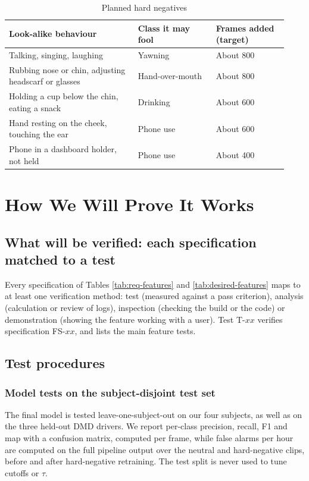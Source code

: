 \begin{table}[htbp]
\centering
\caption{Planned hard negatives}
\label{tab:ch5-04}
\footnotesize
\setlength{\tabcolsep}{3pt}
\renewcommand{\arraystretch}{1.15}
\begin{tabular}{|p{0.430\linewidth}|p{0.260\linewidth}|p{0.240\linewidth}|}
\hline
\textbf{Look-alike behaviour} & \textbf{Class it may fool} & \textbf{Frames added (target)} \\
\hline
Talking, singing, laughing & Yawning & About 800 \\
\hline
Rubbing nose or chin, adjusting headscarf or glasses & Hand-over-mouth & About 800 \\
\hline
Holding a cup below the chin, eating a snack & Drinking & About 600 \\
\hline
Hand resting on the cheek, touching the ear & Phone use & About 600 \\
\hline
Phone in a dashboard holder, not held & Phone use & About 400 \\
\hline
\end{tabular}
\end{table}

\section{How We Will Prove It Works}
\label{sec:verify}
\subsection{What will be verified: each specification matched to a test}

Every specification of Tables \ref{tab:req-features} and \ref{tab:desired-features} maps to at least one verification method: test (measured against a pass criterion), analysis (calculation or review of logs), inspection (checking the build or the code) or demonstration (showing the feature working with a user). Test T-$xx$ verifies specification FS-$xx$, and  lists the main feature tests.

\subsection{Test procedures}
\subsubsection{Model tests on the subject-disjoint test set}

The final model is tested leave-one-subject-out on our four subjects, as well as on the three held-out DMD drivers. We report per-class precision, recall, F1 and \gls{map} with a confusion matrix, computed per frame, while false alarms per hour are computed on the full pipeline output over the neutral and hard-negative clips, before and after hard-negative retraining. The test split is never used to tune cutoffs or $\tau$.


